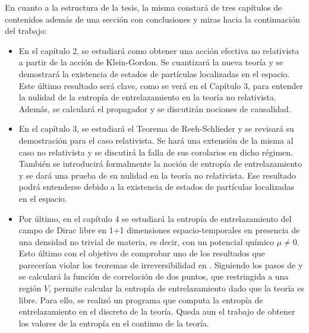 En cuanto a la estructura de la tesis, la misma constará de tres capítulos de contenidos además de una sección con conclusiones y miras hacia la continuación del trabajo: 
\begin{itemize}
\item  En el capítulo 2, se estudiará como obtener una acción efectiva no relativista a partir de la acción de Klein-Gordon. Se cuantizará la nueva teoría y se demostrará la existencia de estados de partículas localizadas en el espacio. Este último resultado será clave, como se verá en el Capítulo 3, para entender la nulidad de la entropía de entrelazamiento en la teoría no relativista. Además, se calculará el propagador y se discutirán nociones de causalidad.
\item En el capítulo 3, se estudiará el Teorema de Reeh-Schlieder y se revisará su demostración para el caso relativista. Se hará una extensión de la misma al caso no relativista y se discutirá la falla de sus corolarios en dicho régimen. También se introducirá formalmente la noción de entropía de entrelazamiento y se dará una prueba de su nulidad en la teoría no relativista. Ese resultado podrá entenderse debido a la existencia de estados de partículas localizadas en el espacio.
\item Por último, en el capítulo 4 se estudiará la entropía de entrelazamiento del campo de Dirac libre en 1+1 dimensiones espacio-temporales en presencia de una densidad no trivial de materia, es decir, con un potencial químico $\mu \neq 0$. Esto último con el objetivo de comprobar uno de los resultados que parecerían violar los teoremas de irreversibilidad en \citep{Swingle:2014}. Siguiendo los pasos de \cite{Casini:2009sr} y \cite{peschel2002} se calculará la función de correlación de dos puntos, que restringida a una región $V$, permite calcular la entropía de entrelazamiento dado que la teoría es libre. Para ello, se realizó un programa que computa la entropía de entrelazamiento en el discreto de la teoría. Queda aun el trabajo de obtener los valores de la entropía en el continuo de la teoría.
\end{itemize}
  


